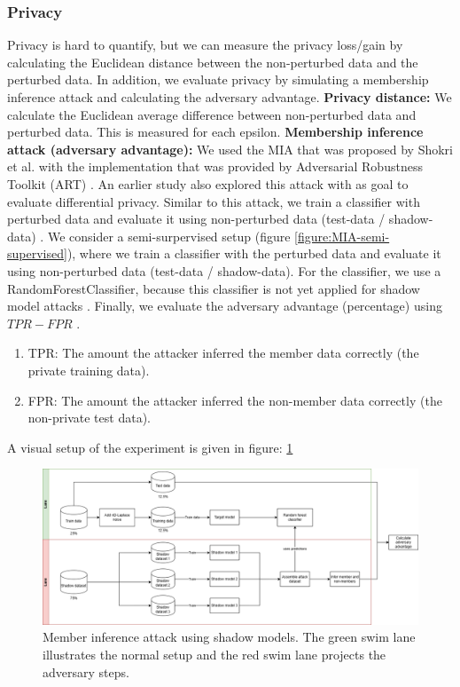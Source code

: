 \subsubsection{Privacy}
Privacy is hard to quantify, but we can measure the privacy loss/gain by calculating the Euclidean distance between the non-perturbed data and the perturbed data.
In addition, we evaluate privacy by simulating a membership inference attack and calculating the adversary advantage. \newline
\textbf{Privacy distance:} We calculate the Euclidean average difference between non-perturbed data and perturbed data.
This is measured for each epsilon. \newline
\textbf{Membership inference attack (adversary advantage):}
%
We used the MIA that was proposed by Shokri et al. with the implementation that was provided by Adversarial Robustness Toolkit (ART) \citep{noauthor_adversarial_2023}.
An earlier study also explored this attack with as goal to evaluate differential privacy.
Similar to this attack, we train a classifier with perturbed data and evaluate it using non-perturbed data (test-data / shadow-data) \citep{zhao_not_2020}.
We consider a semi-surpervised setup (figure \ref{figure:MIA-semi-supervised}), where we train a classifier with the perturbed data and evaluate it using non-perturbed data (test-data / shadow-data).
For the classifier, we use a RandomForestClassifier, because this classifier is not yet applied for shadow model attacks \citep{rigaki_survey_2021}.
Finally, we evaluate the adversary advantage (percentage) using $TPR - FPR$ \cite{yeom_privacy_2018}.
\begin{enumerate}
  \item TPR: The amount the attacker inferred the member data correctly (the private training data).
  \item FPR: The amount the attacker inferred the non-member data correctly (the non-private test data).
\end{enumerate}
A visual setup of the experiment is given in figure: \ref{figure:mi-attack}

\begin{figure}
  \includegraphics[width=1.2\textwidth]{Method/images/MI-setup.png}
  \caption{Member inference attack using shadow models. The green swim lane illustrates the normal setup and the red swim lane projects the adversary steps.}
  \label{figure:mi-attack}
\end{figure}
\newpage

